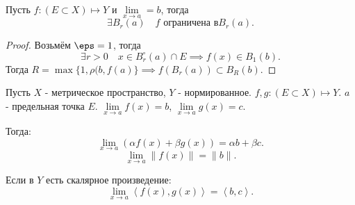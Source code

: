 \begin{theorem} \thmslashn

    Пусть $f : (E \subset X) \mapsto Y$ и $\lim\limits_{x \to a} = b$, тогда
    \[ \exists{B_{r}(a)}\quad f \text{ ограничена в} B_{r}(a) .\]
    \begin{proof}
        Возьмём $\eps = 1$, тогда 
        \[ \exists{r > 0}\quad x\in B^{\circ}_{r}(a)\cap E \implies f(x)\in B_{1}(b) .\]
        Тогда $R = \max \{1, \rho(b, f(a)\} \implies f(B_{r}(a)) \subset B_{R}(b) $.
    \end{proof}
\end{theorem}
\begin{theorem} \thmslashn

    Пусть $X$ - метрическое пространство, $Y$ - нормированное. $f, g : (E \subset X) \mapsto Y$. $a$ - предельная точка $E$. $\lim\limits_{x \to a} f(x) = b$, $\lim\limits_{x \to a} g(x) = c$.

    Тогда:
    \[ \lim\limits_{x \to a} \left( \alpha f(x) + \beta g(x) \right) = \alpha b + \beta c .\]
    \[ \lim\limits_{x \to a}  \|f(x)\|  =  \|b\|  .\]
    
    Если в $Y$ есть скалярное произведение:
    \[ \lim\limits_{x \to a} \left<f(x), g(x)\right> = \left<b, c\right> .\] 
\end{theorem}
